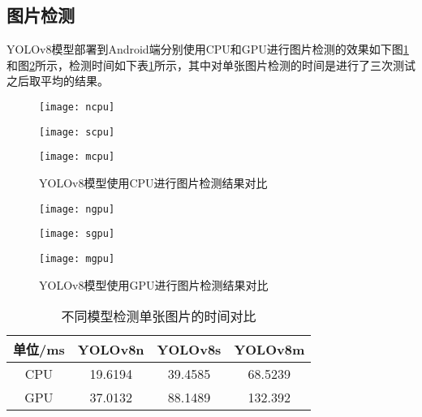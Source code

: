 \documentclass{ctexart}
\numberwithin{equation}{section}%
\numberwithin{figure}{section}%
\numberwithin{table}{section}%
\begin{document}
	\vskip 3cm
	\subsection{图片检测}
	YOLOv8模型部署到Android端分别使用CPU和GPU进行图片检测的效果如下图\ref{t431}和图\ref{t432}所示，检测时间如下表\ref{b1}所示，其中对单张图片检测的时间是进行了三次测试之后取平均的结果。
	
	\begin{figure}[h]
		\centering
		\begin{minipage}{0.28\linewidth}
			\centering
			\texttt{[image: ncpu]}
		\end{minipage}
		\begin{minipage}{0.28\linewidth}
			\centering
			\texttt{[image: scpu]}
		\end{minipage}
		\begin{minipage}{0.28\linewidth}
			\centering
			\texttt{[image: mcpu]}
		\end{minipage}
		\caption{YOLOv8模型使用CPU进行图片检测结果对比}
		\label{t431}%
	\end{figure}
		\begin{figure}[h]
		\centering
		\begin{minipage}{0.28\linewidth}
			\centering
			\texttt{[image: ngpu]}
		\end{minipage}
		\begin{minipage}{0.28\linewidth}
			\centering
			\texttt{[image: sgpu]}
		\end{minipage}
		\begin{minipage}{0.28\linewidth}
			\centering
			\texttt{[image: mgpu]}
		\end{minipage}
		\caption{YOLOv8模型使用GPU进行图片检测结果对比}
		\label{t432}%
	\end{figure}
	\begin{table}[h]
		\centering
		\caption{不同模型检测单张图片的时间对比}\label{b1}
		\begin{tabular}{|c|c|c|c|}
			\hline
			单位/ms&  YOLOv8n & YOLOv8s &YOLOv8m \\
			\hline 
			CPU & 19.6194 & 39.4585 & 68.5239 \\
			\hline
			GPU &  37.0132	& 88.1489 &  132.392 \\
			\hline
		\end{tabular}
	\end{table}
	
\end{document}
